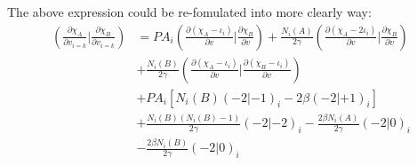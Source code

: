 The above expression could be re-fomulated into more clearly way:
\begin{equation}
 \begin{split}
 \left(  \frac{\partial \chi_{A}}{\partial v_{i=k}}|
 \frac{\partial \chi_{B}}{\partial v_{i=k}} \right)  &=
 PA_{i}
 \left(\frac{\partial (\chi_{A}-\iota_{i})}{\partial v}|
 \frac{\partial \chi_{B}}{\partial v} \right) + 
\frac{N_{i}(A)}{2 \gamma}
 \left(\frac{\partial (\chi_{A}-2\iota_{i})}{\partial v}|
 \frac{\partial \chi_{B}}{\partial v} \right) \\
&+\frac{N_{i}(B)}{2 \gamma}
 \left(\frac{\partial (\chi_{A}-\iota_{i})}{\partial v}|
 \frac{\partial(\chi_{B}-\iota_{i})}{\partial v} \right) \\
&+ PA_{i}\left[ N_{i}(B)(-2|-1)_{i} -2\beta(-2|+1)_{i} \right] \\
&+\frac{N_{i}(B)(N_{i}(B)-1)}{2 \gamma}(-2|-2)_{i} - 
\frac{2\beta N_{i}(A)}{2 \gamma} (-2|0)_{i} \\
&-\frac{2\beta N_{i}(B)}{2 \gamma} (-2|0)_{i}
\end{split}
 \label{OS_kinetic_eq:6}
\end{equation}


